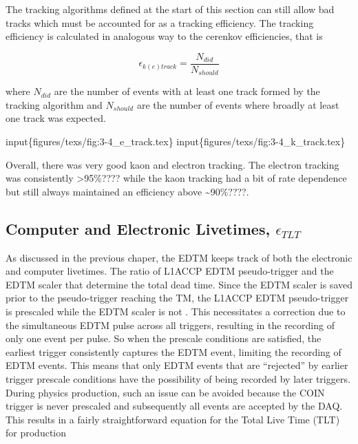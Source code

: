 \documentclass[
]{report}
\begin{document}
The tracking algorithms defined at the start of this section can still
allow bad tracks which must be accounted for as a tracking efficiency.
The tracking efficiency is calculated in analogous way to the cerenkov
efficiencies, that is

\begin{equation} 
  \epsilon_{k(e)track}=\frac{N_{did}}{N_{should}}
  \label{eq:track_eff} 
\end{equation}

\noindent where \(N_{did}\) are the number of events with at least one
track formed by the tracking algorithm and \(N_{should}\) are the number
of events where broadly at least one track was expected.

input\{figures/texs/fig:3-4\_e\_track.tex\}
input\{figures/texs/fig:3-4\_k\_track.tex\}

Overall, there was very good kaon and electron tracking. The electron
tracking was consistently \textgreater95\%???? while the kaon tracking
had a bit of rate dependence but still always maintained an efficiency
above \textasciitilde90\%????.

\hypertarget{computer-and-electronic-livetimes-epsilon_tlt}{%
\subsection{\texorpdfstring{Computer and Electronic Livetimes,
\(\epsilon_{TLT}\)}{Computer and Electronic Livetimes, \textbackslash epsilon\_\{TLT\}}}\label{computer-and-electronic-livetimes-epsilon_tlt}}

As discussed in the previous chaper, the EDTM keeps track of both the
electronic and computer livetimes. The ratio of L1ACCP EDTM
pseudo-trigger and the EDTM scaler that determine the total dead time.
Since the EDTM scaler is saved prior to the pseudo-trigger reaching the
TM, the L1ACCP EDTM pseudo-trigger is prescaled while the EDTM scaler is
not \cite{murphy_edtm_2022}. This necessitates a correction due to the
simultaneous EDTM pulse across all triggers, resulting in the recording
of only one event per pulse. So when the prescale conditions are
satisfied, the earliest trigger consistently captures the EDTM event,
limiting the recording of EDTM events. This means that only EDTM events
that are ``rejected'' by earlier trigger prescale conditions have the
possibility of being recorded by later triggers. During physics
production, such an issue can be avoided because the COIN trigger is
never prescaled and subsequently all events are accepted by the DAQ.
This results in a fairly straightforward equation for the Total Live
Time (TLT) for production
\end{document}
